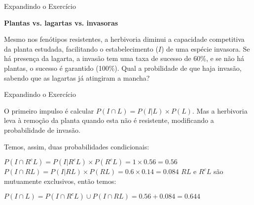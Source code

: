 \documentclass{beamer}\usepackage[]{graphicx}\usepackage[]{color}
\begin{document}
\begin{frame}{Expandindo o Exercício}

\textbf{Plantas vs. lagartas vs. invasoras}

\begin{small}

Mesmo nos fenótipos resistentes, a herbivoria diminui a capacidade competitiva da planta estudada, facilitando o estabelecimento ($I$) de uma espécie invasora. Se há presença da lagarta, a invasão tem uma taxa de sucesso de 60\%, e se não há plantas, o sucesso é garantido (100\%). 
\vfill
Qual a probilidade de que haja invasão, sabendo que as lagartas já atingiram a mancha?

\end{small}

\end{frame}

\begin{frame}{Expandindo o Exercício}

\begin{small}

O primeiro impulso é calcular $P(I \cap L) = P(I|L) \times P(L)$. Mas a herbivoria leva à remoção da planta quando esta não é resistente, modificando a probabilidade de invasão.

Temos, assim, duas probabilidades condicionais:

$P(I \cap R^cL) = P(I|R^cL) \times P(R^cL) = 1 \times 0.56 = 0.56$
\vfill
$P(I \cap RL) = P(I|RL) \times P(RL) = 0.6 \times 0.14 = 0.084$
\vfill
$RL$ e $R^cL$ são mutuamente exclusivos, então temos:

$P(I \cap L) = P(I \cap R^cL) \cup P(I \cap RL) = 0.56 + 0.084  = 0.644$


\end{small}

\end{frame}
\end{document}
